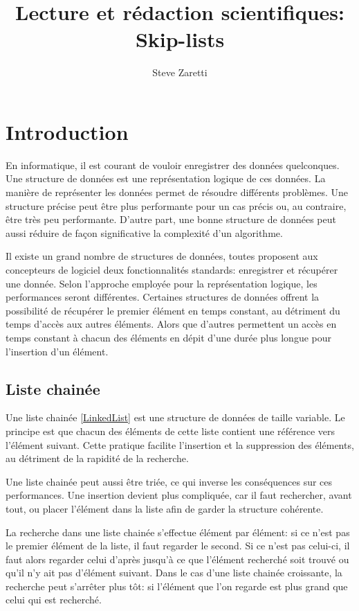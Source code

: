 \documentclass[hidelinks,a4paper, 12pt]{article}
\title{Lecture et rédaction scientifiques: \\Skip-lists }
\author{Steve Zaretti}
\begin{document}
	
	\maketitle
	\newpage
	\tableofcontents
	\newpage
	
	\section{Introduction}
	En informatique, il est courant de vouloir enregistrer des données quelconques. Une structure de données est une représentation logique de ces données. La manière de représenter les données permet de résoudre  différents problèmes. Une structure précise peut être plus performante pour un cas précis ou, au contraire, être très peu performante. D'autre part, une bonne structure de données peut aussi réduire de façon significative la complexité d'un algorithme.
	
	Il existe un grand nombre de structures de données, toutes proposent aux concepteurs de logiciel deux fonctionnalités standards: enregistrer et récupérer une donnée. Selon l'approche employée pour la représentation logique, les performances seront différentes. Certaines structures de données offrent la possibilité de récupérer le premier élément en temps constant, au détriment du temps d'accès aux autres éléments. Alors que d'autres permettent un accès en temps constant à chacun des éléments en dépit d'une durée plus longue pour l'insertion d'un élément.
	
	\subsection{Liste chainée}
	Une liste chainée \cref{LinkedList} est une structure de données de taille variable. Le principe est que chacun des éléments de cette liste contient une référence vers l'élément suivant. Cette pratique facilite l'insertion et la suppression des éléments, au détriment de la rapidité de la recherche.
	
	Une liste chainée peut aussi être triée, ce qui inverse les conséquences sur ces performances. Une insertion devient plus compliquée, car il faut rechercher, avant tout, ou placer l'élément dans la liste afin de garder la structure cohérente.
	
	La recherche dans une liste chainée s'effectue élément par élément: si ce n'est pas le premier élément de la liste, il faut regarder le second. Si ce n'est pas celui-ci, il faut alors regarder celui d'après jusqu'à ce que l'élément recherché soit trouvé ou qu'il n'y ait pas d'élément suivant. Dans le cas d'une liste chainée croissante, la recherche peut s'arrêter plus tôt: si l'élément que l'on regarde est plus grand que celui qui est recherché.
	
\end{document}

